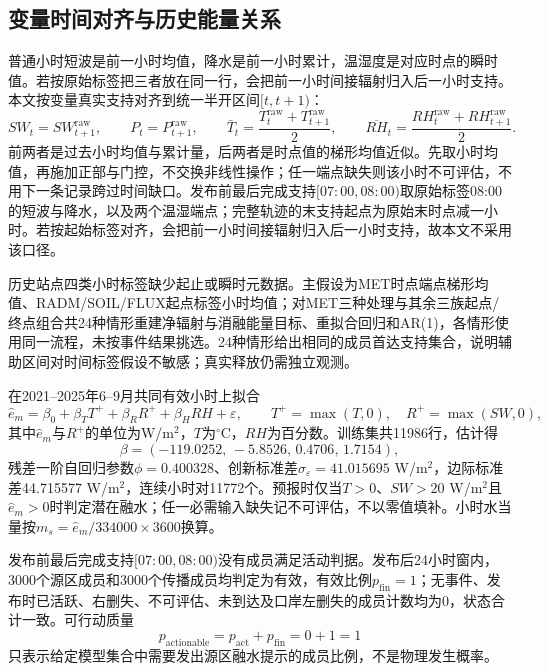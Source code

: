 \subsection{变量时间对齐与历史能量关系}
普通小时短波是前一小时均值，降水是前一小时累计，温湿度是对应时点的瞬时值。若按原始标签把三者放在同一行，会把前一小时间接辐射归入后一小时支持。本文按变量真实支持对齐到统一半开区间$[t,t+1)$：
\begin{equation}
SW_t=SW^{\mathrm{raw}}_{t+1},\qquad
P_t=P^{\mathrm{raw}}_{t+1},\qquad
\bar T_t=\frac{T^{\mathrm{raw}}_{t}+T^{\mathrm{raw}}_{t+1}}{2},\qquad
\overline{RH}_t=\frac{RH^{\mathrm{raw}}_{t}+RH^{\mathrm{raw}}_{t+1}}{2}.
\label{eq:support}
\end{equation}
前两者是过去小时均值与累计量，后两者是时点值的梯形均值近似。先取小时均值，再施加正部与门控，不交换非线性操作；任一端点缺失则该小时不可评估，不用下一条记录跨过时间缺口。发布前最后完成支持$[07{:}00,08{:}00)$取原始标签08:00的短波与降水，以及两个温湿端点；完整轨迹的末支持起点为原始末时点减一小时。若按起始标签对齐，会把前一小时间接辐射归入后一小时支持，故本文不采用该口径。

历史站点四类小时标签缺少起止或瞬时元数据。主假设为MET时点端点梯形均值、RADM/SOIL/FLUX起点标签小时均值；对MET三种处理与其余三族起点/终点组合共24种情形重建净辐射与消融能量目标、重拟合回归和AR(1)，各情形使用同一流程，未按事件结果挑选。24种情形给出相同的成员首达支持集合，说明辅助区间对时间标签假设不敏感；真实释放仍需独立观测。

在2021--2025年6--9月共同有效小时上拟合
\begin{equation}
\hat e_m=\beta_0+\beta_T T^++\beta_R R^++\beta_H RH+\varepsilon,
\qquad
T^+=\max(T,0),\quad R^+=\max(SW,0),
\end{equation}
其中$\hat e_m$与$R^+$的单位为W/m$^2$，$T$为$^\circ$C，$RH$为百分数。训练集共11986行，估计得
\begin{equation}
\beta=(-119.0252,\,-5.8526,\,0.4706,\,1.7154),
\end{equation}
残差一阶自回归参数$\phi=0.400328$、创新标准差$\sigma_\varepsilon=41.015695$ W/m$^2$，边际标准差44.715577 W/m$^2$，连续小时对11772个。预报时仅当$T>0$、$SW>20$ W/m$^2$且$\hat e_m>0$时判定潜在融水；任一必需输入缺失记不可评估，不以零值填补。小时水当量按$m_s=\hat e_m/334000\times3600$换算。

发布前最后完成支持$[07{:}00,08{:}00)$没有成员满足活动判据。发布后24小时窗内，3000个源区成员和3000个传播成员均判定为有效，有效比例$p_{\mathrm{fin}}=1$；无事件、发布时已活跃、右删失、不可评估、未到达及口岸左删失的成员计数均为0，状态合计一致。可行动质量
\begin{equation}
p_{\mathrm{actionable}}=p_{\mathrm{act}}+p_{\mathrm{fin}}=0+1=1
\end{equation}
只表示给定模型集合中需要发出源区融水提示的成员比例，不是物理发生概率。

